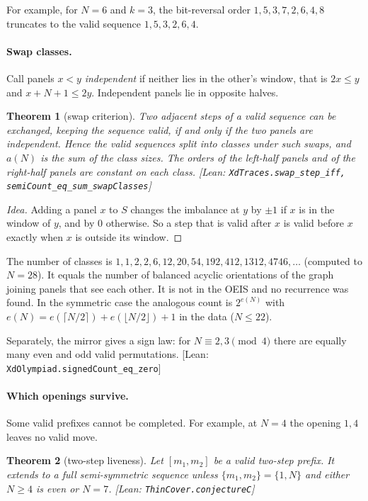 \documentclass[11pt]{article}
\newtheorem{theorem}{Theorem}
\theoremstyle{definition}
\theoremstyle{remark}
\newcommand{\lean}[1]{\textsf{\small[Lean: \texttt{#1}]}}
\begin{document}
For example, for $N=6$ and $k=3$, the bit-reversal order $1,5,3,7,2,6,4,8$ truncates to
the valid sequence $1,5,3,2,6,4$.

\paragraph{Swap classes.}
Call panels $x<y$ \emph{independent} if neither lies in the other's window, that is
$2x\le y$ and $x+N+1\le 2y$. Independent panels lie in opposite halves.

\begin{theorem}[swap criterion]
Two adjacent steps of a valid sequence can be exchanged, keeping the sequence valid, if
and only if the two panels are independent. Hence the valid sequences split into classes
under such swaps, and $a(N)$ is the sum of the class sizes. The orders of the left-half
panels and of the right-half panels are constant on each class.
\lean{XdTraces.swap\_step\_iff, semiCount\_eq\_sum\_swapClasses}
\end{theorem}

\begin{proof}[Idea]
Adding a panel $x$ to $S$ changes the imbalance at $y$ by $\pm1$ if $x$ is in the window
of $y$, and by $0$ otherwise. So a step that is valid after $x$ is valid before $x$
exactly when $x$ is outside its window.
\end{proof}

The number of classes is $1,1,2,2,6,12,20,54,192,412,1312,4746,\dots$ (computed to
$N=28$). It equals the number of balanced acyclic orientations of the graph joining
panels that see each other. It is not in the OEIS and no recurrence was found. In the
symmetric case the analogous count is $2^{e(N)}$ with
$e(N)=e(\lceil N/2\rceil)+e(\lfloor N/2\rfloor)+1$ in the data ($N\le22$).

Separately, the mirror gives a sign law: for $N\equiv 2,3\pmod 4$ there are equally many
even and odd valid permutations. \lean{XdOlympiad.signedCount\_eq\_zero}

\paragraph{Which openings survive.}
Some valid prefixes cannot be completed. For example, at $N=4$ the opening $1,4$
leaves no valid move.

\begin{theorem}[two-step liveness]
Let $[m_1,m_2]$ be a valid two-step prefix. It extends to a full semi-symmetric
sequence unless $\{m_1,m_2\}=\{1,N\}$ and either $N\ge4$ is even or $N=7$.
\lean{ThinCover.conjectureC}
\end{theorem}
\end{document}
